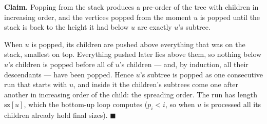 \begin{invariantbox}
\textbf{Claim.} Popping from the stack produces a pre-order of the tree with children in increasing order, and the vertices popped from the moment $u$ is popped until the stack is back to the height it had below $u$ are exactly $u$'s subtree.

When $u$ is popped, its children are pushed above everything that was on the stack, smallest on top. Everything pushed later lies above them, so nothing below $u$'s children is popped before all of $u$'s children --- and, by induction, all their descendants --- have been popped. Hence $u$'s subtree is popped as one consecutive run that starts with $u$, and inside it the children's subtrees come one after another in increasing order of the child: the spreading order. The run has length $\mathrm{sz}[u]$, which the bottom-up loop computes ($p_i < i$, so when $u$ is processed all its children already hold final sizes). \hfill$\blacksquare$
\end{invariantbox}


